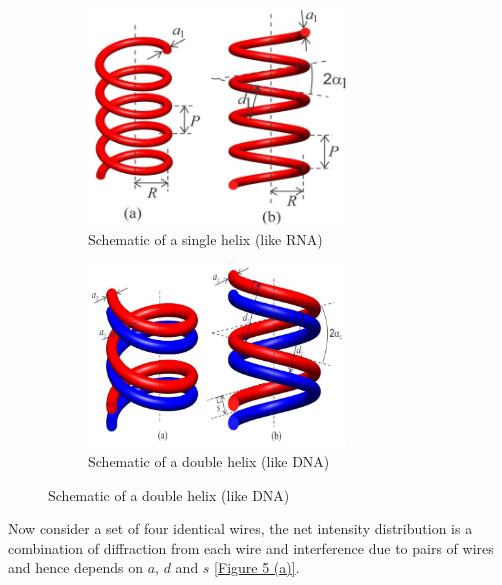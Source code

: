 \begin{figure}[!htb]
    \centering
    \begin{subfigure}[b]{0.45\textwidth}
                \centering
                \includegraphics[width=0.75\textwidth]{figs/singlehelix.png}
                \caption{Schematic of a single helix (like RNA)}
                \label{fig:singlehelix1}
        \end{subfigure}%
        \begin{subfigure}[b]{0.45\textwidth}
                \centering
                \includegraphics[width=0.75\textwidth]{figs/doublehelix.png}
                \caption{Schematic of a double helix (like DNA)}
                \label{fig:doublehelix1}
        \end{subfigure}
\end{figure}

Now consider a set of four identical wires, the net intensity distribution is a combination of diffraction from each wire and interference due to pairs of wires and hence depends on $a$, $d$ and $s$ \ref{Figure 5 (a)}.

